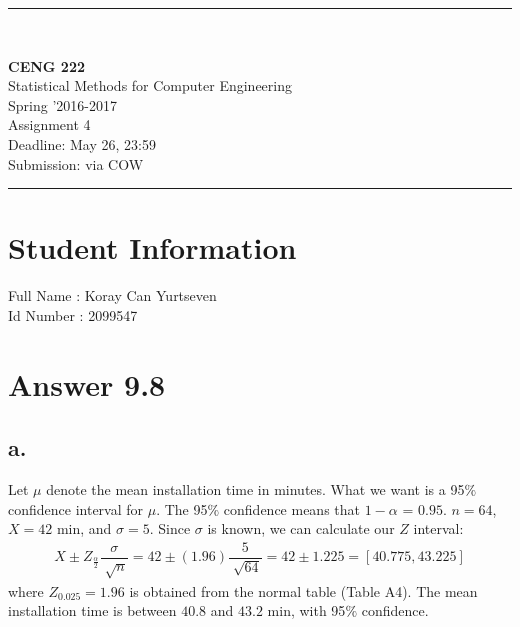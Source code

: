 \documentclass[12pt]{article}
\newcommand{\HRule}{\rule{\linewidth}{1mm}}
\begin{document}
\noindent
\HRule \\[3mm]
\begin{flushright}

                                         \LARGE \textbf{CENG 222}  \\[4mm]
                                         \Large Statistical Methods for Computer Engineering \\[4mm]
                                        \normalsize      Spring '2016-2017 \\
                                           \Large   Assignment 4 \\
                    \normalsize Deadline: May 26, 23:59 \\
                    \normalsize Submission: via COW
\end{flushright}
\HRule

\section*{Student Information }
Full Name :  Koray Can Yurtseven\\
Id Number :  2099547\\

\section*{Answer 9.8}
\subsection*{a.}
Let $\mu$ denote the mean installation time in minutes. What we want is a 95$\%$ confidence interval for $\mu$.  The 95$\%$ confidence means that $1 - \alpha$ = $0.95$. $n = 64$, $X = 42$ min, and $\sigma = 5$. Since $\sigma$ is known, we can calculate our $Z$ interval:
\begin{align*}
X \pm Z_{\frac{\alpha}{2}} \dfrac{\sigma}{\sqrt[]{n}} = 42 \pm (1.96) \dfrac{5}{\sqrt[]{64}} = 42 \pm 1.225 = [40.775,43.225]
\end{align*}
where $Z_{0.025} = 1.96$ is obtained from the normal table (Table A4). The mean installation time is between $40.8$ and $43.2$ min, with 95$\%$ confidence.
\end{document}
